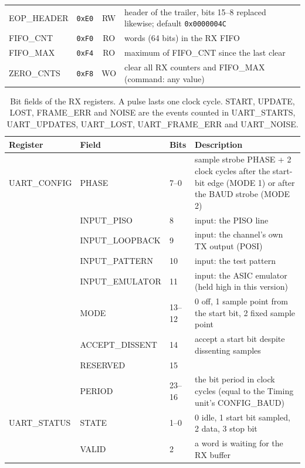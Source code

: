 \documentclass[12pt]{article}
\newcommand{\hex}[1]{\texttt{0x#1}}
\begin{document}
\begin{table}[htbp]
\begin{center}
\begin{tabularx}{\textwidth}{llcL}
EOP\_HEADER       & \hex{E0} & RW & header of the trailer, bits 15--8 replaced likewise; default \hex{0000004C} \\
FIFO\_CNT         & \hex{F0} & RO & words (64 bits) in the RX FIFO \\
FIFO\_MAX         & \hex{F4} & RO & maximum of FIFO\_CNT since the last clear \\
ZERO\_CNTS        & \hex{F8} & WO & clear all RX counters and FIFO\_MAX (command: any value) \\
\bottomrule
\end{tabularx}
\end{center}
\end{table}

\begin{table}[htbp]
\caption{\label{tbl:rx-bits} Bit fields of the RX registers.  A pulse lasts one clock cycle.  START, UPDATE,
  LOST, FRAME\_ERR and NOISE are the events counted in UART\_STARTS, UART\_UPDATES, UART\_LOST,
  UART\_FRAME\_ERR and UART\_NOISE.}
\begin{center}\small
\begin{tabularx}{\textwidth}{lllL}
\toprule
Register       & Field   & Bits   & Description \\
\midrule
UART\_CONFIG   & PHASE   & 7--0   & sample strobe PHASE + 2 clock cycles after the start-bit edge (MODE 1) or after the BAUD strobe (MODE 2) \\
               & INPUT\_PISO & 8   & input:  the PISO line \\
               & INPUT\_LOOPBACK & 9 & input:  the channel's own TX output (POSI) \\
               & INPUT\_PATTERN & 10 & input:  the test pattern \\
               & INPUT\_EMULATOR & 11 & input:  the ASIC emulator (held high in this version) \\
               & MODE    & 13--12 & 0 off, 1 sample point from the start bit, 2 fixed sample point \\
               & ACCEPT\_DISSENT & 14 & accept a start bit despite dissenting samples \\
               & RESERVED & 15    & \\
               & PERIOD  & 23--16 & the bit period in clock cycles (equal to the Timing unit's CONFIG\_BAUD) \\
\midrule
UART\_STATUS   & STATE   & 1--0   & 0 idle, 1 start bit sampled, 2 data, 3 stop bit \\
               & VALID   & 2      & a word is waiting for the RX buffer \\

\end{tabularx}
\end{center}
\end{table}
\end{document}

